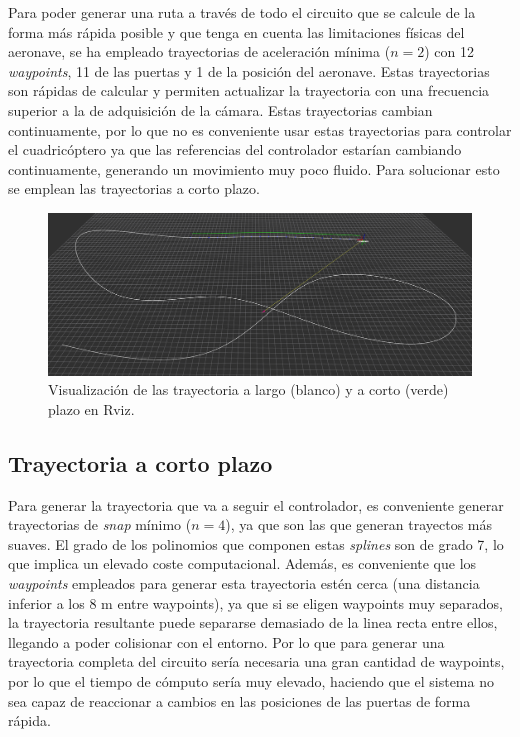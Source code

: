 Para poder generar una ruta a través de todo el circuito que se calcule de la forma más rápida posible y que tenga en cuenta las limitaciones físicas del aeronave, se ha empleado trayectorias de aceleración mínima ($n = 2$) con 12 \textit{waypoints}, 11 de las puertas y 1 de la posición del aeronave. Estas trayectorias son rápidas de calcular y permiten actualizar la trayectoria con una frecuencia superior a la de adquisición de la cámara. Estas trayectorias cambian continuamente, por lo que no es conveniente usar estas trayectorias para controlar el cuadricóptero ya que las referencias del controlador estarían cambiando continuamente, generando un movimiento muy poco fluido. Para solucionar esto se emplean las trayectorias a corto plazo.

\begin{figure}[htb!]
	\centering
	\includegraphics[width=1\textwidth]{imagenes/Rviz_traj_largo}
	\caption{Visualización de las trayectoria a largo (blanco) y a corto (verde) plazo en Rviz.}
	\label{rviz:traj_largo}
\end{figure}
\newpage

\subsection{Trayectoria a corto plazo}

Para generar la trayectoria que va a seguir el controlador, es conveniente generar trayectorias de \textit{snap} mínimo ($n=4$), ya que son las que generan trayectos más suaves. El grado de los polinomios que componen estas \textit{splines} son de grado 7, lo que implica un elevado coste computacional. Además, es conveniente que los \textit{waypoints} empleados para generar esta trayectoria estén cerca (una distancia inferior a los 8 m entre waypoints), ya que si se eligen waypoints muy separados, la trayectoria resultante puede separarse demasiado de la linea recta entre ellos, llegando a poder colisionar con el entorno. Por lo que para generar una trayectoria completa del circuito sería necesaria una gran cantidad de waypoints, por lo que el tiempo de cómputo sería muy elevado, haciendo que el sistema no sea capaz de reaccionar a cambios en las posiciones de las puertas de forma rápida.

